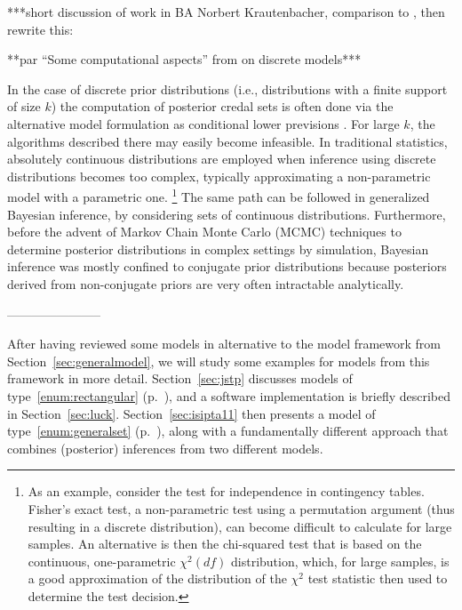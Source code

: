 \medskip

***short discussion of work in BA Norbert Krautenbacher,
comparison to \parencite{2005:whitcomb}, then rewrite this:

**par ``Some computational aspects'' from \textcite[\S 4.2]{itip-statinf} on discrete models***

In the case of discrete prior distributions (i.e., distributions with a finite support of size $k$)
the computation of posterior credal sets is often done
via the alternative model formulation as conditional lower previsions
\parencite[see, e.g.,][]{itip-computation}.
For large $k$, the algorithms described there may easily become infeasible.
In traditional statistics, absolutely continuous distributions are employed
when inference using discrete distributions becomes too complex,
typically approximating a non-parametric model with a parametric one.%
\footnote{As an example, consider the test for independence in contingency tables.
Fisher's exact test, a non-parametric test using a permutation argument (thus resulting in a discrete distribution),
can become difficult to calculate for large samples.
An alternative is then the chi-squared test that is based on the continuous, one-parametric $\chi^2(df)$ distribution,
which, for large samples, is a good approximation of the distribution of the $\chi^2$ test statistic then used to determine the test decision.}
The same path can be followed in generalized Bayesian inference,
by considering sets of continuous distributions.
Furthermore, before the advent of Markov Chain Monte Carlo (MCMC) techniques \parencite[see, e.g.,][]{1998:gilks}
to determine posterior distributions in complex settings by simulation,
Bayesian inference was mostly confined to conjugate prior distributions
because posteriors derived from non-conjugate priors are very often intractable analytically.




-----------------------

\medskip

After having reviewed some models in alternative to the model framework from Section~\ref{sec:generalmodel},
we will study some examples for models from this framework in more detail.
Section~\ref{sec:jstp} discusses models of type~\ref{enum:rectangular} (p.~\pageref{enum:rectangular}),
and a software implementation is briefly described in Section~\ref{sec:luck}.
Section~\ref{sec:isipta11} then presents a model of type~\ref{enum:generalset} (p.~\pageref{enum:generalset}),
along with a fundamentally different approach that combines (posterior) inferences from two different models.


